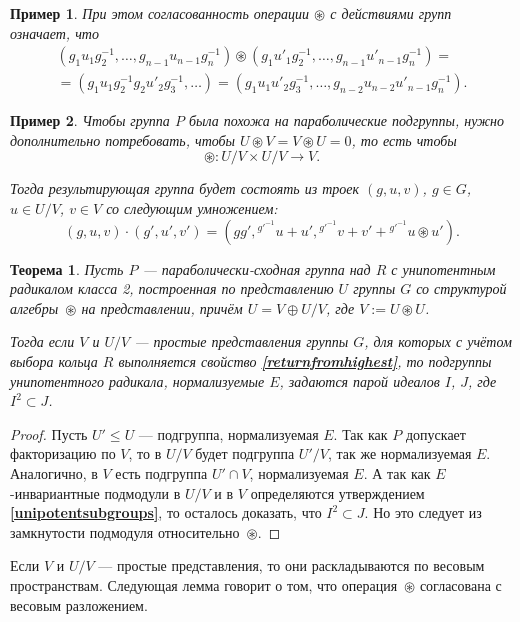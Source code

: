 \documentclass[12pt]{matmex-diploma}
\theoremstyle{mystyleni}
\theoremstyle{mystyle}
\newtheorem{thm}{Теорема}
\newtheorem{example}{Пример}
\newcommand\refb[1]{\textbf{\ref{#1}}}
\renewcommand{\le}{\leqslant}
\begin{document}
\begin{example}
При этом согласованность операции $\circledast$ с действиями групп означает, что
\begin{multline*}
(g_1 u_1 g_2^{-1}, \ldots, g_{n-1} u_{n-1} g_n^{-1}) \circledast (g_1 u'_1 g_2^{-1}, \ldots, g_{n-1} u'_{n-1} g_n^{-1}) 
= \\ =
(g_1 u_1 g_2^{-1} g_2 u'_2 g_3^{-1}, \ldots) = 
(g_1 u_1 u'_2 {g}_3^{-1}, \ldots, g_{n-2} u_{n-2} u'_{n-1} g_n^{-1}).
\end{multline*}
\end{example}

\begin{example}
Чтобы группа $P$ была похожа на параболические подгруппы, нужно дополнительно потребовать, чтобы $U \circledast V = V \circledast U = 0$, то есть чтобы
$$ \circledast : U/V \times U/V \to V.$$

Тогда результирующая группа будет состоять из троек $(g,u,v)$, $g \in G$, $u \in U/V$, $v \in V$ со следующим умножением:
$$
(g,u,v)\cdot (g',u',v') = (g g', {}^{g'^{-1}} u + u', {}^{g'^{-1}} v + v' + {}^{g'^{-1}} u \circledast u').
$$
\end{example}

\begin{thm}
Пусть $P$ --- параболически-сходная группа над $R$ с унипотентным радикалом класса 2, построенная по представлению $U$ группы $G$ со структурой алгебры~${\circledast}$ на представлении, причём  $U=V \oplus U/V$, где $V:=U\circledast U$.

Тогда если $V$ и $U/V$ --- простые представления группы $G$, для которых с учётом выбора кольца $R$ выполняется свойство \refb{returnfromhighest}, то подгруппы унипотентного радикала, нормализуемые $E$, задаются парой идеалов $I$, $J$, где $I^2 \subset J$.
\end{thm}
\begin{proof}
Пусть $U'\le U$ --- подгруппа, нормализуемая $E$. Так как $P$ допускает факторизацию по $V$, то в $U/V$ будет подгруппа $U'/V$, так же нормализуемая $E$. Аналогично, в $V$ есть подгруппа $U' \cap V$, нормализуемая $E$. А так как $E$-инвариантные подмодули в $U/V$ и в $V$ определяются утверждением \refb{unipotentsubgroups}, то осталось доказать, что $I^2 \subset J$. Но это следует из замкнутости подмодуля относительно~${\circledast}$.
\end{proof}

Если $V$ и $U/V$ --- простые представления, то они раскладываются по весовым пространствам. Следующая лемма говорит о том, что операция~${\circledast}$ согласована с весовым разложением.
\end{document}
